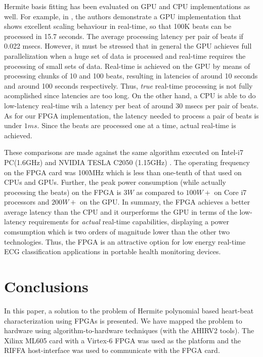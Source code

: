 \documentclass[conference]{IEEEtran}
\begin{document}
Hermite basis fitting has been evaluated on GPU and CPU implementations
as well.  For example, in \cite{c:GPU}, the authors demonstrate a
GPU implementation that shows excellent scaling behaviour in real-time, so that 
100K beats can be processed in 15.7 seconds. The average processing latency per 
pair of beats if 0.022 msecs.  However, it must be stressed that in general the GPU achieves 
full parallelization when a huge set of data is processed and real-time requires the processing 
of small sets of data. Real-time is achieved on the GPU by means of processing chunks of 10 and 100 beats, 
resulting in latencies of around 10 seconds and around 100 seconds respectively. Thus, 
{\em true} real-time processing is not fully acomplished since latencies are too long. 
On the other hand, a CPU is able to do low-latency real-time wih a latency per beat of around 
30 msecs per pair of beats.  As for our FPGA implementation, the latency needed to process a pair of beats 
is under $1ms$. Since the beats are processed one at a time, actual real-time is achieved. 

These comparisons are made against the same algorithm executed on Intel-i7 PC(1.6GHz) 
and NVIDIA TESLA C2050 (1.15GHz) \cite{c:GPU}. The operating frequency on the FPGA
card was 100MHz which is less than one-tenth of that used on CPUs and GPUs.
Further, the peak power consumption (while actually processing the beats) on the FPGA is $3W$ as compared to 
$100W+$ on Core i7 processors and $200W+$ on the GPU.  %
In summary, the FPGA achieves a better average latency than the CPU and it ourperforms the 
GPU in terms of the low-latency requirements for \textit{actual} real-time capabilities, 
displaying a power comsumption which is two orders of magnitude lower than the other two technologies. 
Thus, the FPGA is an attractive option for low energy real-time ECG classification
applications in portable health monitoring devices.

\section{Conclusions}\label{s:conclusions}

In this paper, a solution to the problem of Hermite polynomial
based heart-beat characterization using FPGAs is presented.
We have mapped the problem to hardware using algorithm-to-hardware
techniques (with the AHIRV2 tools).  The Xilinx ML605 card with a
Virtex-6 FPGA was used as the platform and the RIFFA host-interface was used to
communicate with the FPGA card. 
\end{document}
